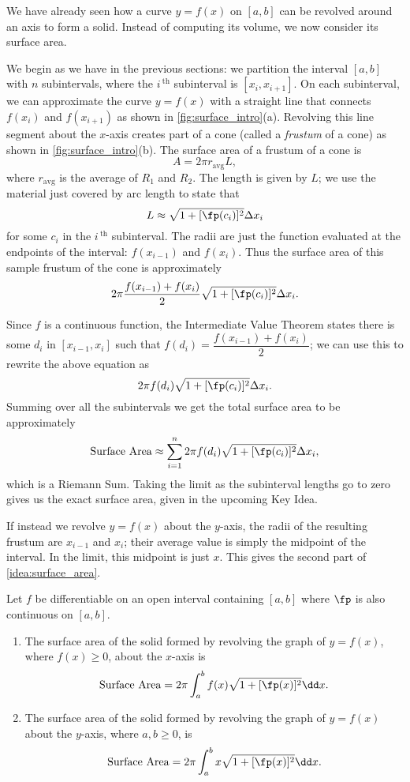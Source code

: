 We have already seen how a curve $y=f(x)$ on $[a,b]$ can be revolved around an axis to form a solid. Instead of computing its volume, we now consider its surface area.

We begin as we have in the previous sections: we partition the interval $[a,b]$ with $n$ subintervals, where the $i\,^{\text{th}}$ subinterval is $[x_i,x_{i+1}]$. On each subinterval, we can approximate the curve $y=f(x)$ with a straight line that connects $f(x_i)$ and $f(x_{i+1})$ as shown in \autoref{fig:surface_intro}(a). Revolving this line segment about the $x$-axis creates part of a cone (called a \emph{frustum} of a cone) as shown in \autoref{fig:surface_intro}(b). The surface area of a frustum of a cone is
\[A=2\pi r_{\text{avg}} L,\]
where $r_{\text{avg}}$ is the average of $R_1$ and $R_2$.  The length is given by $L$; we use the material just covered by arc length to state that
\[L\approx \sqrt{1+[\fp(c_i)]^2}\Delta x_i\]
for some $c_i$ in the $i\,^\text{th}$ subinterval. The radii are just the function evaluated at the endpoints of the interval: $f(x_{i-1})$ and $f(x_i)$. Thus the surface area of this sample frustum of the cone is approximately 
\[2\pi\frac{f(x_{i-1})+f(x_i)}2\sqrt{1+[\fp(c_i)]^2}\Delta x_i.\]

Since $f$ is a continuous function, the Intermediate Value Theorem states there is some $d_i$ in $[x_{i-1},x_i]$ such that $f(d_i)=\dfrac{f(x_{i-1})+f(x_i)}2$; we can use this to rewrite the above equation as
\[2\pi f(d_i)\sqrt{1+[\fp(c_i)]^2}\Delta x_i.\]
Summing over all the subintervals we get the total surface area to be approximately 
\[\text{Surface Area}\approx \sum_{i=1}^n 2\pi f(d_i)\sqrt{1+[\fp(c_i)]^2}\Delta x_i,\]
which is a Riemann Sum. Taking the limit as the subinterval lengths go to zero gives us the exact surface area, given in the upcoming Key Idea.

If instead we revolve $y=f(x)$ about the $y$-axis, the radii of the resulting frustum are $x_{i-1}$ and $x_i$; their average value is simply the midpoint of the interval. In the limit, this midpoint is just $x$. This gives the second part of \autoref{idea:surface_area}.

\begin{keyidea}\label{idea:surface_area}
Let $f$ be differentiable on an open interval containing $[a,b]$ where $\fp$ is also continuous on $[a,b]$. 
\begin{enumerate}
	\item	The surface area of the solid formed by revolving the graph of $y=f(x)$, where $f(x)\geq0$, about the $x$-axis is
	\[\text{Surface Area} = 2\pi\int_a^b f(x)\sqrt{1+[\fp(x)]^2}\dd x.\]
	\item	The surface area of the solid formed by revolving the graph of $y=f(x)$ about the $y$-axis, where $a,b\geq0$, is
	\[\text{Surface Area} = 2\pi\int_a^b x\sqrt{1+[\fp(x)]^2}\dd x.\]
\end{enumerate}
\end{keyidea}

